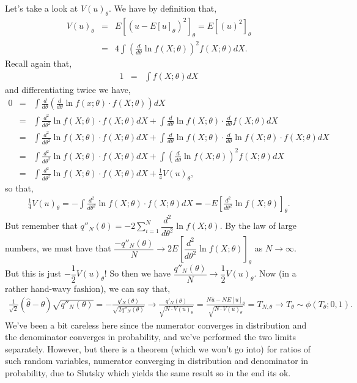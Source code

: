 Let's take a look at $V(u)_{\theta}$. We have by definition that, \begin{eqnarray}
    V(u)_{\theta} & = &  E\left[(u-E[u]_{\theta})^{2}\right]_{\theta} = E\left[(u)^{2}\right]_{\theta} \\
     & = & 4\int \left(\frac{d}{d\theta}\ln f(X;\theta)\right)^{2}f(X;\theta)dX.
\end{eqnarray}
Recall again that, 
\begin{eqnarray}
    1 & = & \int f(X;\theta)dX
\end{eqnarray}
and differentiating twice we have, 
\begin{eqnarray}
    0 & = & \int \frac{d}{d\theta}\left(\frac{d}{d\theta}\ln f(x;\theta)\cdot f(X;\theta)\right)dX \\
     & = & \int \frac{d^2}{d\theta^2}\ln f(X;\theta) \cdot f(X;\theta)dX +  \int \frac{d}{d\theta}\ln f(X;\theta) \cdot \frac{d}{d\theta}f(X;\theta)dX  \\
     & = & \int \frac{d^2}{d\theta^2}\ln f(X;\theta) \cdot f(X;\theta)dX +  \int \frac{d}{d\theta}\ln f(X;\theta) \cdot \frac{d}{d\theta}\ln f(X;\theta)\cdot f(X;\theta) dX\\ 
     & = & \int \frac{d^2}{d\theta^2}\ln f(X;\theta) \cdot f(X;\theta)dX +  \int \left(\frac{d}{d\theta}\ln f(X;\theta) \right)^{2} f(X;\theta) dX \\
     & = & \int \frac{d^2}{d\theta^2}\ln f(X;\theta) \cdot f(X;\theta)dX +  \frac{1}{4}V(u)_{\theta}, 
\end{eqnarray}
so that, 
\begin{eqnarray}
\frac{1}{4}V(u)_{\theta} = - \int \frac{d^2}{d\theta^2}\ln f(X;\theta) \cdot f(X;\theta)dX = - E\left[\frac{d^{2}}{d\theta^{2}}\ln f(X;\theta)\right]_{\theta}.
\end{eqnarray}
But remember that $q''_{N}(\theta) = -2 \sum_{i=1}^{N} \dfrac{d^2}{d\theta^2}\ln f(X;\theta)$. By the law of large numbers, we must have that $\dfrac{-q''_{N}(\theta)}{N}\rightarrow 2E\left[\dfrac{d^2}{d\theta^2}\ln f(X;\theta)\right]_{\theta}$ as $N\rightarrow \infty$. But this is just $-\dfrac{1}{2}V(u)_{\theta}$! So then we have $\dfrac{q''_{N}(\theta)}{N}\rightarrow  \dfrac{1}{2}V(u)_{\theta}$.
Now (in a rather hand-wavy fashion), we can say that,
\begin{eqnarray}\label{eqn:part1}
  \frac{1}{\sqrt{2}}(\hat{\theta}-\theta)\sqrt{q''_{N}(\theta)}  = -\frac{q'_{N}(\theta)}{\sqrt{2 q''_{N}(\theta)}} \rightarrow 
\frac{q'_{N}(\theta)}{\sqrt{N\cdot V(u)_{\theta} }} = \frac{N\bar{u}-NE[u]_{\theta}}{\sqrt{N\cdot V(u)_{\theta} }} = T_{N,\theta} \rightarrow T_{\theta}\sim\phi(T_{\theta};0,1).
\end{eqnarray}
We've been a bit careless here since the numerator converges in distribution and the denominator converges in probability, and we've performed the two limits separately. However, but there is a theorem (which we won't go into) for ratios of such random variables, numerator converging in distribution and denominator in probability, due to Slutsky which yields the same result so in the end its ok.  

